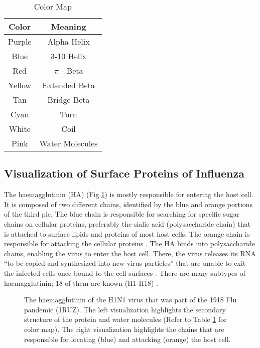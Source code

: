 \documentclass[conference]{IEEEtran}
\begin{document}
\begin{table}[htbp]
\caption{Color Map}
\begin{center}
\begin{tabular}{ |c|c| } 
\hline
\textbf{Color} & \textbf{Meaning}\\ 
\hline
Purple & Alpha Helix \\ 
\hline
Blue & 3-10 Helix \\ 
\hline
Red & $\pi$ - Beta\\ 
\hline
Yellow & Extended Beta \\ 
\hline
Tan & Bridge Beta \\ 
\hline
Cyan & Turn \\ 
\hline
White & Coil \\ 
\hline
Pink & Water Molecules \\ 
\hline
\end{tabular}
\label{tab1}
\end{center}
\end{table}

\subsection{Visualization of Surface Proteins of Influenza }


The haemagglutinin (HA) (Fig.\ref{fig:ha_protein}) is mostly responsible for entering the host cell. It is composed of two different chains, identified by the blue and orange portions of the third pic. The blue chain is responsible for searching for specific sugar chains on cellular proteins, preferably the sialic acid (polysaccharide chain) that is attached to surface lipids and proteins of most host cells. The orange chain is responsible for attacking the cellular proteins \citep{Goodsell} \citep{Hagen}. The HA binds into polysaccharide chains, enabling the virus to enter the host cell. There, the virus releases its RNA “to be copied and synthesized into new virus particles” that are unable to exit the infected cells once bound to the cell surfaces \citep{Hagen}.  There are many subtypes of haemagglutinin; 18 of them are known (H1-H18) \citep{CDC}. 

\begin{figure}[htbp]
    \centering
\caption{The haemagglutinin of the H1N1 virus that was part of the 1918 Flu pandemic (1RUZ). The left visualization highlights the secondary structure of the protein and water molecules (Refer to Table \ref{tab1} for color map). The right visualization highlights the chains that are responsible for locating (blue) and attacking (orange) the host cell.}
\label{fig:ha_protein}
\end{figure}
\end{document}
